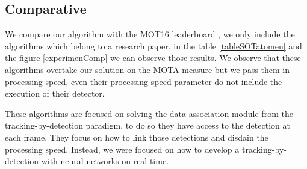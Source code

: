 \subsection{Comparative}

%

We compare our algorithm with the MOT16 leaderboard \cite{motResults}, we only include the algorithms which belong to a research paper, in the table \ref{tableSOTatomeu} and the figure \ref{experimenComp} we can observe those results. We observe that these algorithms overtake our solution on the MOTA measure but we pass them in processing speed, even their processing speed parameter do not include the execution of their detector.

These algorithms are focused on solving the data association module from the tracking-by-detection paradigm, to do so they have access to the detection at each frame. They focus on how to link those detections and disdain the processing speed. Instead, we were focused on how to develop a tracking-by-detection with neural networks on real time.
 

